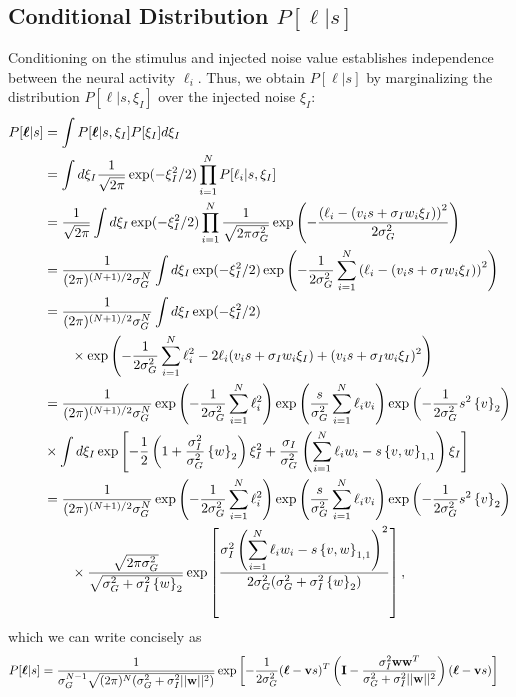 \documentclass[11pt]{article}
\begin{document}
	\subsection{Conditional Distribution $P[\boldsymbol{\ell}|s]$}
	Conditioning on the stimulus and injected noise value establishes independence between the neural activity $\ell_i$. Thus, we obtain $P[\boldsymbol{\ell}|s]$ by marginalizing the distribution $P[\boldsymbol{\ell}|s,\xi_I]$ over the injected noise $\xi_I$:
	\begin{align}
	P[\boldsymbol{\ell}|s] &= \int P[\boldsymbol{\ell}|s, \xi_I] P[\xi_I]d\xi_I \\
	&= \int d\xi_I  \frac{1}{\sqrt{2\pi}} \exp(-\xi_I^2/2) \prod_{i=1}^N P[\ell_i|s,\xi_I] \\
	&=  \frac{1}{\sqrt{2\pi}} \int d\xi_I   \exp(-\xi_I^2/2) \prod_{i=1}^N \frac{1}{\sqrt{2\pi \sigma_G^2}} \exp\left(-\frac{\left(\ell_i - (v_i s + \sigma_I w_i \xi_I)\right)^2}{2\sigma_G^2}\right) \\
	&= \frac{1}{(2\pi)^{(N+1)/2}\sigma_G^N} \int d\xi_I \exp(-\xi_I^2/2) \exp\left(-\frac{1}{2\sigma_G^2}\sum_{i=1}^N \left(\ell_i - (v_i s + \sigma_I w_i \xi_I)\right)^2\right) \\
	&= \frac{1}{(2\pi)^{(N+1)/2}\sigma_G^N} \int d\xi_I \exp(-\xi_I^2/2) \notag \\
	& \qquad \times \exp\left(-\frac{1}{2\sigma_G^2}\sum_{i=1}^N \ell_i^2 -2\ell_i (v_i s + \sigma_I w_i \xi_I) + (v_i s + \sigma_I w_i \xi_I)^2\right) \\
	&= \frac{1}{(2\pi)^{(N+1)/2}\sigma_G^N} \exp\left(-\frac{1}{2\sigma_G^2}\sum_{i=1}^N \ell_i^2\right)\exp\left(\frac{s}{\sigma_G^2}\sum_{i=1}^N \ell_i v_i \right)\exp\left(-\frac{1}{2\sigma_G^2}s^2 \left\{v\right\}_2\right) \notag \\
	&\times \int d\xi_I\exp\left[-\frac{1}{2}\left(1+\frac{\sigma_I^2}{\sigma_G^2} \left\{w\right\}_2\right)\xi_I^2 +\frac{\sigma_I}{\sigma_G^2}\left( \sum_{i=1}^N \ell_i w_i - s \left\{v,w\right\}_{1,1}\right)\xi_I \right] \\
	&=  \frac{1}{(2\pi)^{(N+1)/2}\sigma_G^N}\exp\left(-\frac{1}{2\sigma_G^2}\sum_{i=1}^N \ell_i^2\right)\exp\left(\frac{s}{\sigma_G^2}\sum_{i=1}^N \ell_i v_i \right)\exp\left(-\frac{1}{2\sigma_G^2}s^2 \left\{v\right\}_2\right) \notag \\
	&\qquad \times \frac{\sqrt{2\pi \sigma_G^2}}{\sqrt{\sigma_G^2 + \sigma_I^2 \left\{w\right\}_2}}\exp\left[\frac{\sigma_I^2\left(\displaystyle\sum_{i=1}^N \ell_i w_i - s  \left\{v,w\right\}_{1,1}\right)^2}{2 \sigma_G^2 (\sigma_G^2 + \sigma_I^2 \left\{w\right\}_2)}\right],
	\end{align}
	which we can write concisely as
	\begin{align}
		P[\boldsymbol{\ell}|s] &= \frac{1}{\sigma_G^{N-1} \sqrt{(2\pi)^N(\sigma_G^2 + \sigma_I^2 ||\mathbf{w}||^2)}} \exp\left[-\frac{1}{2\sigma_G^2} (\boldsymbol{\ell} - \mathbf{v}s)^T\left(\mathbf{I} - \frac{\sigma_I^2 \mathbf{ww}^T}{\sigma_G^2 + \sigma_I^2 ||\mathbf{w}||^2}\right) (\boldsymbol{\ell} - \mathbf{v}s) \right] \notag 
	\end{align}
	
\end{document}

